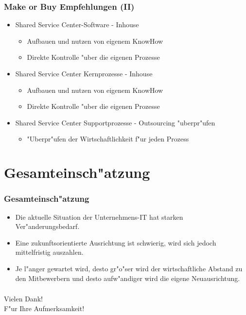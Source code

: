 \documentclass{beamer}
\begin{document}
\begin{frame}
  \frametitle{Make or Buy Empfehlungen (II)}
  \begin{itemize}
  
    \item Shared Service Center-Software - Inhouse
		\begin{itemize}
			\item Aufbauen und nutzen von eigenem KnowHow
			\item Direkte Kontrolle "uber die eigenen Prozesse\vspace{2mm}
		\end{itemize}

	\item Shared Service Center Kernprozesse - Inhouse
		\begin{itemize}
			\item Aufbauen und nutzen von eigenem KnowHow
			\item Direkte Kontrolle "uber die eigenen Prozesse\vspace{2mm}
		\end{itemize}
			
	\item Shared Service Center Supportprozesse - Outsourcing "uberpr"ufen
			\begin{itemize}
			\item "Uberpr"ufen der Wirtschaftlichkeit f"ur jeden Prozess
		\end{itemize}
	
  \end{itemize}
\end{frame}

\section{Gesamteinsch"atzung}
\begin{frame}

  \frametitle{Gesamteinsch"atzung}
   \begin{itemize}
   	\item Die aktuelle Situation der Unternehmens-IT hat starken Ver"anderungsbedarf.\vspace{2mm}
   	\item Eine zukunftsorientierte Ausrichtung ist schwierig, wird sich jedoch mittelfristig auszahlen.\vspace{2mm}
   \item Je l"anger gewartet wird, desto gr"o"ser wird der wirtschaftliche Abstand zu den Mitbewerbern und desto aufw"andiger wird die eigene Neuausrichtung. 
   \end{itemize}

\end{frame}

\begin{frame}

  \frametitle{ }
   	Vielen Dank! \\
	F"ur Ihre Aufmerksamkeit!

\end{frame}
\end{document}
